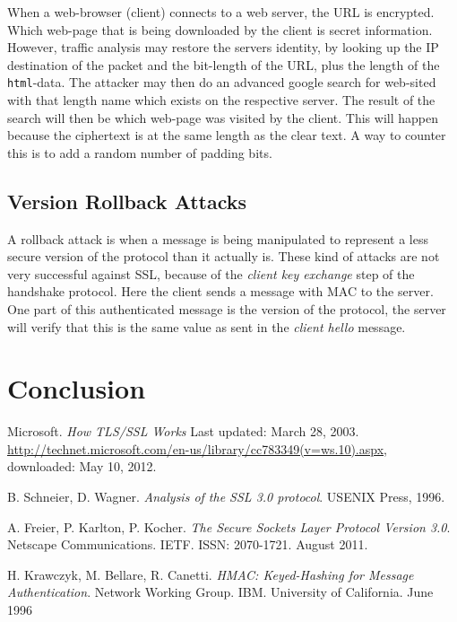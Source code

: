 \documentclass[11pt,a4paper, twocolumn]{article}
\begin{document}
When a web-browser (client) connects to a web server, the URL is encrypted. Which web-page that is being downloaded by the client is secret information. However, traffic analysis may restore the servers identity, by looking up the IP destination of the packet and the bit-length of the URL, plus the length of the \texttt{html}-data. The attacker may then do an advanced google search for web-sited with that length name which exists on the respective server. The result of the search will then be which web-page was visited by the client. This will happen because the ciphertext is at the same length as the clear text. A  way to counter this is to add a random number of padding bits.

\subsection{Version Rollback Attacks}
A rollback attack is when a message is being manipulated to represent a less secure version of the protocol than it actually is. 
These kind of attacks are not very successful against SSL, because of the \textit{client key exchange} step of the handshake protocol. Here the client sends a message with MAC to the server. One part of this authenticated message is the version of the protocol, the server will verify that this is the same value as sent in the \textit{client hello} message. 

\section{Conclusion}
\newpage{}
\begin{thebibliography}{}

    Microsoft. 
    \emph{How TLS/SSL Works}
    Last updated: March 28, 2003. 
    \url{http://technet.microsoft.com/en-us/library/cc783349(v=ws.10).aspx}, 
    downloaded: May 10, 2012.

    B. Schneier, D. Wagner. 
    \emph{Analysis of the SSL 3.0 protocol}.
    USENIX Press, 1996.

       A. Freier, P. Karlton, P. Kocher. 
       \emph{The Secure Sockets Layer Protocol Version 3.0}.
       Netscape Communications. IETF. 
       ISSN: 2070-1721. August 2011.

      H. Krawczyk, M. Bellare, R. Canetti.
      \emph{HMAC: Keyed-Hashing for Message Authentication}.
       Network Working Group. IBM. University of California. June 1996
    

\end{thebibliography}

\listoffigures
\listoftables

%
\end{document}
